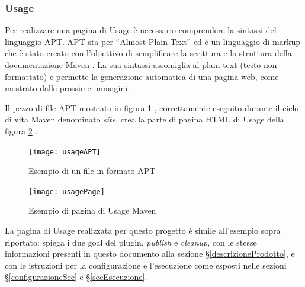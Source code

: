         \subsubsection{Usage}
        Per realizzare una pagina di Usage è necessario comprendere la sintassi del linguaggio APT.
        APT sta per ``Almost Plain Text'' ed è un linguaggio di markup che è stato creato con l'obiettivo di semplificare la scrittura e la struttura della documentazione Maven \cite{site:apt}.
        La sua sintassi assomiglia al plain-text (testo non formattato) e permette la generazione automatica di una pagina web, come mostrato dalle prossime immagini.

        Il pezzo di file APT mostrato in figura \ref{usageAPT} \cite{site:apt-file}, correttamente eseguito durante il ciclo di vita Maven denominato \emph{site}, crea la parte di pagina HTML di Usage della figura \ref{usageImage} \cite{site:maven-usage}.

        \begin{figure}[H]
            \centering
            \texttt{[image: usageAPT]}\\
            \caption{Esempio di un file in formato APT}
            \label{usageAPT}
        \end{figure}

        \begin{figure}[H]
            \centering
            \texttt{[image: usagePage]}\\
            \caption{Esempio di pagina di Usage Maven}
            \label{usageImage}
        \end{figure}

        La pagina di Usage realizzata per questo progetto è simile all'esempio sopra riportato: spiega i due goal del plugin, \emph{publish} e \emph{cleanup}, con le stesse informazioni presenti in questo documento alla sezione \S\ref{descrizioneProdotto}, e con le istruzioni per la configurazione e l'esecuzione come esposti nelle sezioni \S\ref{configurazioneSec} e \S\ref{secEsecuzione}.

